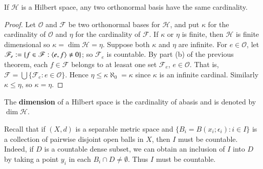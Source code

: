 \begin{prop}
    If $\mathscr{H}$ is a Hilbert space, any two orthonormal basis have the same cardinality.
\end{prop}
\begin{proof}
    Let $\mathscr{O}$ and $\mathscr{F}$ be two orthonormal bases for $\mathscr{H}$, and put $\kappa$ for the cardinality of $\mathscr{O}$ and $\eta$ for the cardinality of $\mathscr{F}$. If $\kappa$ or $\eta$ is finite, then $\mathscr{H}$ is finite dimensional so $\kappa = \dim\mathscr{H} = \eta$. Suppose both $\kappa$ and $\eta$ are infinite.  For $e\in \mathscr{O}$, let $\mathscr{F}_e := \{f \in \mathscr{F}:\left\langle e, f\right\rangle \neq 0\}$; so $\mathscr{F}_e$ is countable. By part (b) of the previous theorem, each $f \in \mathscr{F}$ belongs to at leasat one set $\mathscr{F}_e$, $e \in \mathscr{O}$. That is, $\mathscr{F} = \bigcup\{\mathscr{F}_e:e \in \mathscr{O}\}$. Hence $\eta \leq \kappa \aleph_0 = \kappa$ since $\kappa$ is an infinite cardinal. Similarly $\kappa \leq \eta$, so $\kappa = \eta$.
\end{proof}

\begin{defn}
    The \textbf{dimension} of a Hilbert space is the cardinality of abasis and is denoted by $\dim \mathscr{H}$.
\end{defn}

Recall that if $(X,d)$ is a separable metric space and $\{B_i = B(x_i;\epsilon_i):i \in I\}$ is a collection of pairwise disjoint open balls in $X$, then $I$ must be countable. Indeed, if $D$ is a countable dense subset, we can obtain an inclusion of $I$ into $D$ by taking a point $y_i$ in each $B_i \cap D \neq \emptyset$. Thus $I$ must be countable.


